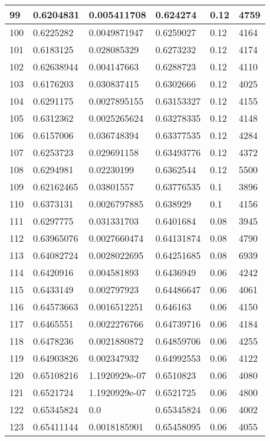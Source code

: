 \begin{longtable}{|l|l|l|l|l|l|}
99 & 0.6204831 & 0.005411708 & 0.624274 & 0.12 & 4759 \\ \hline 
100 & 0.6225282 & 0.0049871947 & 0.6259027 & 0.12 & 4164 \\ \hline 
101 & 0.6183125 & 0.028085329 & 0.6273232 & 0.12 & 4174 \\ \hline 
102 & 0.62638944 & 0.004147663 & 0.6288723 & 0.12 & 4110 \\ \hline 
103 & 0.6176203 & 0.030837415 & 0.6302666 & 0.12 & 4025 \\ \hline 
104 & 0.6291175 & 0.0027895155 & 0.63153327 & 0.12 & 4155 \\ \hline 
105 & 0.6312362 & 0.0025265624 & 0.63278335 & 0.12 & 4148 \\ \hline 
106 & 0.6157006 & 0.036748394 & 0.63377535 & 0.12 & 4284 \\ \hline 
107 & 0.6253723 & 0.029691158 & 0.63493776 & 0.12 & 4372 \\ \hline 
108 & 0.6294981 & 0.02230199 & 0.6362544 & 0.12 & 5500 \\ \hline 
109 & 0.62162465 & 0.03801557 & 0.63776535 & 0.1 & 3896 \\ \hline 
110 & 0.6373131 & 0.0026797885 & 0.638929 & 0.1 & 4156 \\ \hline 
111 & 0.6297775 & 0.031331703 & 0.6401684 & 0.08 & 3945 \\ \hline 
112 & 0.63965076 & 0.0027660474 & 0.64131874 & 0.08 & 4790 \\ \hline 
113 & 0.64082724 & 0.0028022695 & 0.64251685 & 0.08 & 6939 \\ \hline 
114 & 0.6420916 & 0.004581893 & 0.6436949 & 0.06 & 4242 \\ \hline 
115 & 0.6433149 & 0.002797923 & 0.64486647 & 0.06 & 4061 \\ \hline 
116 & 0.64573663 & 0.0016512251 & 0.646163 & 0.06 & 4150 \\ \hline 
117 & 0.6465551 & 0.0022276766 & 0.64739716 & 0.06 & 4184 \\ \hline 
118 & 0.6478236 & 0.0021880872 & 0.64859706 & 0.06 & 4255 \\ \hline 
119 & 0.64903826 & 0.002347932 & 0.64992553 & 0.06 & 4122 \\ \hline 
120 & 0.65108216 & 1.1920929e-07 & 0.6510823 & 0.06 & 4080 \\ \hline 
121 & 0.6521724 & 1.1920929e-07 & 0.6521725 & 0.06 & 4800 \\ \hline 
122 & 0.65345824 & 0.0 & 0.65345824 & 0.06 & 4002 \\ \hline 
123 & 0.65411144 & 0.0018185901 & 0.65458095 & 0.06 & 4055 \\ \hline 

\end{longtable}
